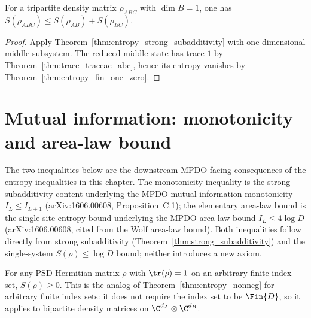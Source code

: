\begin{theorem}\label{thm:entropy_subadditivity_trivial_B}
    \leanok
    For a tripartite density matrix $\rho_{ABC}$ with
    $\dim B = 1$, one has
    $S(\rho_{ABC}) \le S(\rho_{AB}) + S(\rho_{BC})$.
\end{theorem}

\begin{proof}\leanok
    Apply Theorem~\ref{thm:entropy_strong_subadditivity} with
    one-dimensional middle subsystem. The reduced middle state has
    trace $1$ by Theorem~\ref{thm:trace_traceac_abc}, hence its entropy
    vanishes by Theorem~\ref{thm:entropy_fin_one_zero}.
\end{proof}

\section{Mutual information: monotonicity and area-law bound}

The two inequalities below are the downstream MPDO-facing consequences
of the entropy inequalities in this chapter. The monotonicity inequality
is the strong-subadditivity content underlying the MPDO mutual-information
monotonicity $I_L \le I_{L+1}$
(arXiv:1606.00608, Proposition~C.1); the elementary area-law bound is
the single-site entropy bound underlying the MPDO area-law bound
$I_L \le 4\log D$ (arXiv:1606.00608, cited from the Wolf area-law
bound). Both inequalities follow directly from strong subadditivity
(Theorem~\ref{thm:strong_subadditivity}) and the single-system
$S(\rho) \le \log D$ bound; neither introduces a new axiom.

\begin{theorem}
    \label{thm:entropy_nonneg_finite_index}
    \leanok
    For any PSD Hermitian matrix $\rho$ with $\tr(\rho) = 1$ on an
    arbitrary finite index set, $S(\rho) \ge 0$. This is the
    analog of Theorem~\ref{thm:entropy_nonneg} for arbitrary finite
    index sets: it does
    not require the index set to be $\Fin{D}$, so it applies to
    bipartite density matrices on
    $\C^{d_A} \otimes \C^{d_B}$.
\end{theorem}

